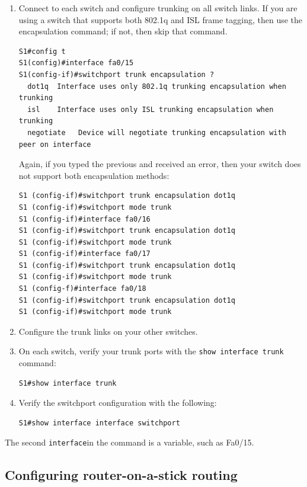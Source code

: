 \documentclass[b5paper,11pt]{memoir}
\begin{document}
\begin{enumerate}
\item
  Connect to each
  switch and configure trunking on all switch links. If you are using a
  switch that supports both 802.1q and ISL frame tagging, then use the
  encapsulation command; if not, then skip that command.

\begin{verbatim}
S1#config t
S1(config)#interface fa0/15
S1(config-if)#switchport trunk encapsulation ?
  dot1q  Interface uses only 802.1q trunking encapsulation when trunking
  isl    Interface uses only ISL trunking encapsulation when trunking
  negotiate   Device will negotiate trunking encapsulation with peer on interface
\end{verbatim}

  Again, if you typed the previous and received an error, then your
  switch does not support both encapsulation methods:

\begin{verbatim}
S1 (config-if)#switchport trunk encapsulation dot1q
S1 (config-if)#switchport mode trunk
S1 (config-if)#interface fa0/16
S1 (config-if)#switchport trunk encapsulation dot1q
S1 (config-if)#switchport mode trunk
S1 (config-if)#interface fa0/17
S1 (config-if)#switchport trunk encapsulation dot1q
S1 (config-if)#switchport mode trunk
S1 (config-f)#interface fa0/18
S1 (config-if)#switchport trunk encapsulation dot1q
S1 (config-if)#switchport mode trunk
\end{verbatim}
\item
  Configure the trunk links on your other switches.
\item
  On each switch, verify your trunk ports with the
  \texttt{show\ interface\ trunk} command:

\begin{verbatim}
S1#show interface trunk
\end{verbatim}
\item
  Verify the switchport configuration with the following:

\begin{verbatim}
S1#show interface interface switchport
\end{verbatim}
\end{enumerate}

The second \texttt{interface}in the command is a variable, such as
Fa0/15.

\subsection{Configuring router-on-a-stick routing}
\end{document}
